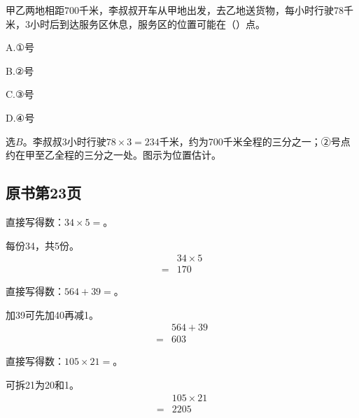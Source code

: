 甲乙两地相距700千米，李叔叔开车从甲地出发，去乙地送货物，每小时行驶78千米，3小时后到达服务区休息，服务区的位置可能在（\hspace{1.8em}）点。\par
\noindent A.①号\par
\noindent B.②号\par
\noindent C.③号\par
\noindent D.④号\par
{}
\begin{BookAnswer}
选\(B\)。李叔叔3小时行驶\(78\times3=234\)千米，约为700千米全程的三分之一；②号点约在甲至乙全程的三分之一处。图示为位置估计。
\end{BookAnswer}



\subsection*{原书第23页}

直接写得数：\(34\times5=\)。\par
\begin{BookAnswer}
每份34，共5份。\[\begin{aligned} &34\times5\\={}&170\end{aligned}\]
\end{BookAnswer}

直接写得数：\(564+39=\)。\par
\begin{BookAnswer}
加39可先加40再减1。\[\begin{aligned} &564+39\\={}&603\end{aligned}\]
\end{BookAnswer}

直接写得数：\(105\times21=\)。\par
\begin{BookAnswer}
可拆21为20和1。\[\begin{aligned} &105\times21\\={}&2205\end{aligned}\]
\end{BookAnswer}

